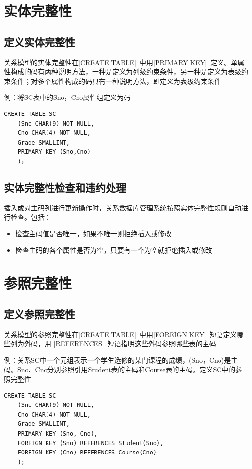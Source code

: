 \section{实体完整性}

\subsection{定义实体完整性}
关系模型的实体完整性在\sverb|CREATE TABLE|\ 中用\sverb|PRIMARY KEY|\ 定义。单属性构成的码有两种说明方法，一种是定义为列级约束条件，另一种是定义为表级约束条件；对多个属性构成的码只有一种说明方法，即定义为表级约束条件

例：将SC表中的Sno，Cno属性组定义为码
\begin{lstlisting}
CREATE TABLE SC
	(Sno CHAR(9) NOT NULL, 
	Cno CHAR(4) NOT NULL,  
	Grade SMALLINT,
	PRIMARY KEY (Sno,Cno)
	); 
\end{lstlisting}

\subsection{实体完整性检查和违约处理}
插入或对主码列进行更新操作时，关系数据库管理系统按照实体完整性规则自动进行检查。包括：
\begin{itemize}
    \item 检查主码值是否唯一，如果不唯一则拒绝插入或修改
    \item 检查主码的各个属性是否为空，只要有一个为空就拒绝插入或修改
\end{itemize}

\section{参照完整性}

\subsection{定义参照完整性}
关系模型的参照完整性在\sverb|CREATE TABLE|\ 中用\sverb|FOREIGN KEY|\ 短语定义哪些列为外码，用 \sverb|REFERENCES|\ 短语指明这些外码参照哪些表的主码

例：关系SC中一个元组表示一个学生选修的某门课程的成绩，(Sno，Cno)是主码。Sno、Cno分别参照引用Student表的主码和Course表的主码。定义SC中的参照完整性
\begin{lstlisting}
CREATE TABLE SC
	(Sno CHAR(9) NOT NULL, 
	Cno CHAR(4) NOT NULL,  
	Grade SMALLINT,
	PRIMARY KEY (Sno, Cno),  
	FOREIGN KEY (Sno) REFERENCES Student(Sno),  
	FOREIGN KEY (Cno) REFERENCES Course(Cno)    
	);
\end{lstlisting}

